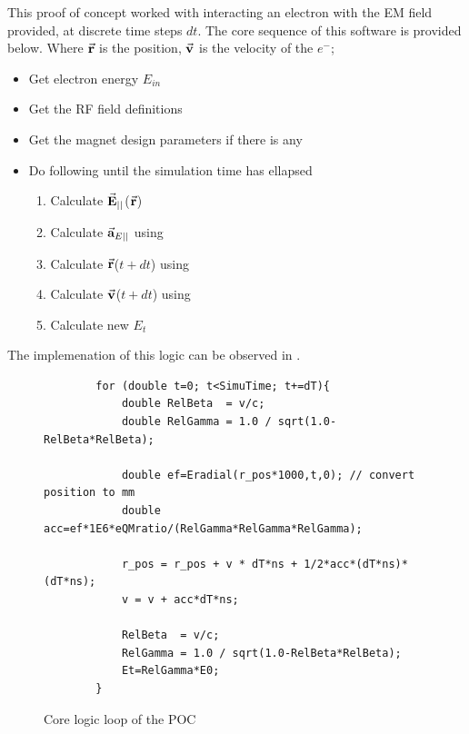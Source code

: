 \documentclass[a4paper,oneside,12pt]{report}
\numberwithin{equation}{chapter}
\begin{document}
This proof of concept worked with interacting an electron with the EM field provided, at discrete time steps $dt$. The core sequence of this software is provided below.
Where $\vec{\textbf{r}}$ is the position, $\vec{\textbf{v}}$ is the velocity of the $e^-$;
\begin{itemize}
    \item Get electron energy $E_{in}$
    \item Get the RF field definitions
    \item Get the magnet design parameters if there is any
    \item Do following until the simulation time has ellapsed
    \begin{enumerate}
        \item Calculate $\vec{\textbf{E}}_{||}$($\vec{\textbf{r}}$)
        \item Calculate $\vec{\textbf{a}}_{E ||}$ using 
        \item Calculate $\vec{\textbf{r}}$($t+dt$) using 
        \item Calculate $\vec{\textbf{v}}$($t+dt$) using 
        \item Calculate new $E_t$
    \end{enumerate}
\end{itemize}

The implemenation of this logic can be observed in . 
\begin{figure}[H]
    \begin{verbatim}
        for (double t=0; t<SimuTime; t+=dT){
            double RelBeta  = v/c;
            double RelGamma = 1.0 / sqrt(1.0-RelBeta*RelBeta);
        
            double ef=Eradial(r_pos*1000,t,0); // convert position to mm
            double acc=ef*1E6*eQMratio/(RelGamma*RelGamma*RelGamma); 
        
            r_pos = r_pos + v * dT*ns + 1/2*acc*(dT*ns)*(dT*ns);
            v = v + acc*dT*ns;

            RelBeta  = v/c;
            RelGamma = 1.0 / sqrt(1.0-RelBeta*RelBeta);
            Et=RelGamma*E0; 
        }
    \end{verbatim}
    \caption{Core logic loop of the POC}
    \label{fig:POC_core_logic}
\end{figure}
\end{document}
